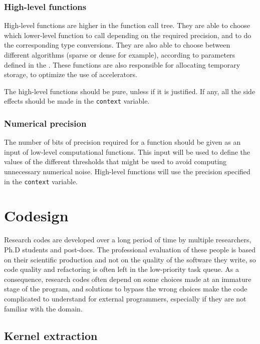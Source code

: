 \subsubsection{High-level functions}

High-level functions  are higher in the function  call tree.
They  are  able  to  choose which  lower-level  function  to  call
depending on the required precision, and to do the corresponding type
conversions. They are also able to choose between different algorithms
(sparse or dense for example), according to parameters defined in the
{\context}.  These functions are also responsible for allocating
temporary storage, to optimize the use of accelerators.

The high-level functions should be pure, unless if it is
justified. If any, all the side effects should be made in the
\texttt{context} variable.

\subsubsection{Numerical precision}

The number of bits of precision  required for a function should be
given as an input of low-level computational functions. This input
will be used to define the values of the different thresholds that
might be used to avoid computing unnecessary numerical
noise. High-level functions will use the precision specified in the
\texttt{context} variable.


\section{Codesign}
\label{sec:codesign}

Research codes are developed over a long period of time by multiple
researchers, Ph.D students and post-docs. The professional evaluation
of these people is based on their scientific production and not on the
quality of the software they write, so code quality and refactoring is
often left in the low-priority task queue. As a consequence, research
codes often depend on some choices made at an immature stage of the
program, and solutions to bypass the wrong choices make the code
complicated to understand for external programmers, especially if they
are not familiar with the domain.

\subsection{Kernel extraction}

